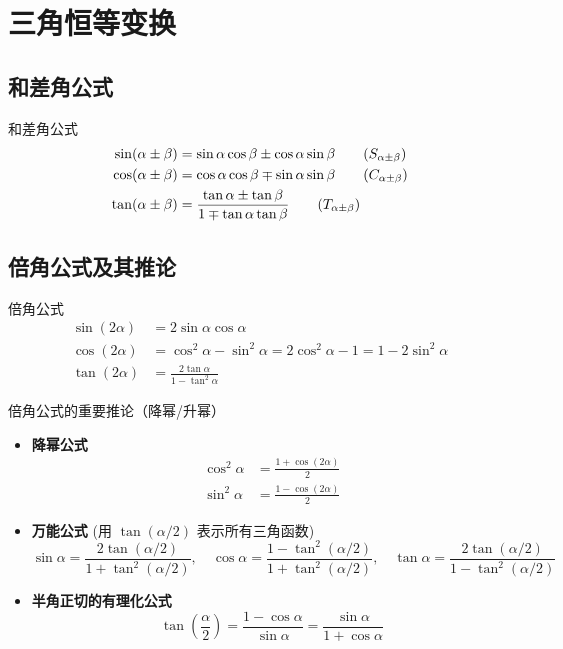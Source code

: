\documentclass[a4paper,11pt]{ctexart}
\begin{document}
\section{三角恒等变换}

\subsection{和差角公式}
\begin{theorembox}{和差角公式}
\begin{align*}
    \sin(\alpha \pm \beta) &= \sin\alpha\cos\beta \pm \cos\alpha\sin\beta \tag{$S_{\alpha\pm\beta}$} \\
    \cos(\alpha \pm \beta) &= \cos\alpha\cos\beta \mp \sin\alpha\sin\beta \tag{$C_{\alpha\pm\beta}$} \\
    \tan(\alpha \pm \beta) &= \frac{\tan\alpha \pm \tan\beta}{1 \mp \tan\alpha\tan\beta} \tag{$T_{\alpha\pm\beta}$}
\end{align*}
\end{theorembox}

\subsection{倍角公式及其推论}
\begin{theorembox}{倍角公式}
\begin{align*}
    \sin(2\alpha) &= 2\sin\alpha\cos\alpha \\
    \cos(2\alpha) &= \cos^2\alpha - \sin^2\alpha = 2\cos^2\alpha - 1 = 1 - 2\sin^2\alpha \\
    \tan(2\alpha) &= \frac{2\tan\alpha}{1 - \tan^2\alpha}
\end{align*}
\end{theorembox}

\begin{examplebox}{倍角公式的重要推论（降幂/升幂）}
\begin{itemize}
    \item \textbf{降幂公式}
        \begin{align*}
            \cos^2\alpha &= \frac{1 + \cos(2\alpha)}{2} \\
            \sin^2\alpha &= \frac{1 - \cos(2\alpha)}{2}
        \end{align*}
    \item \textbf{万能公式} (用 $\tan(\alpha/2)$ 表示所有三角函数)
        \[ \sin\alpha = \frac{2\tan(\alpha/2)}{1+\tan^2(\alpha/2)}, \quad \cos\alpha = \frac{1-\tan^2(\alpha/2)}{1+\tan^2(\alpha/2)}, \quad \tan\alpha = \frac{2\tan(\alpha/2)}{1-\tan^2(\alpha/2)} \]
    \item \textbf{半角正切的有理化公式}
        \[ \tan\left(\frac{\alpha}{2}\right) = \frac{1 - \cos\alpha}{\sin\alpha} = \frac{\sin\alpha}{1 + \cos\alpha} \]
\end{itemize}
\end{examplebox}
\end{document}
